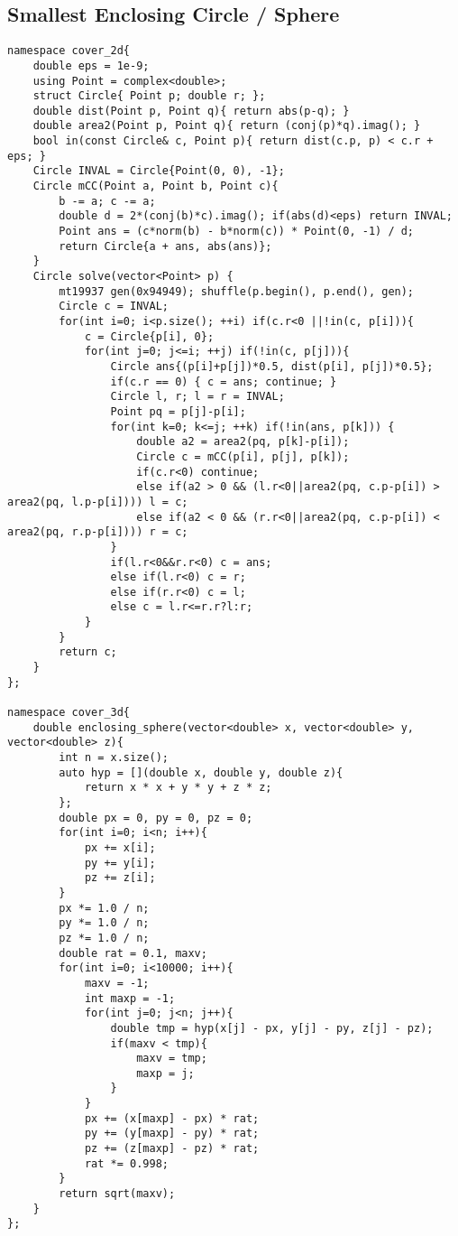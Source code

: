 \documentclass[landscape, 8pt, a4paper, oneside, twocolumn]{extarticle}
\begin{document}
\subsection{Smallest Enclosing Circle / Sphere}
\begin{verbatim}
namespace cover_2d{
	double eps = 1e-9;
	using Point = complex<double>;
	struct Circle{ Point p; double r; };
	double dist(Point p, Point q){ return abs(p-q); }
	double area2(Point p, Point q){ return (conj(p)*q).imag(); }
	bool in(const Circle& c, Point p){ return dist(c.p, p) < c.r + eps; }
	Circle INVAL = Circle{Point(0, 0), -1};
	Circle mCC(Point a, Point b, Point c){
		b -= a; c -= a;
		double d = 2*(conj(b)*c).imag(); if(abs(d)<eps) return INVAL;
		Point ans = (c*norm(b) - b*norm(c)) * Point(0, -1) / d;
		return Circle{a + ans, abs(ans)};
	}
	Circle solve(vector<Point> p) {
		mt19937 gen(0x94949); shuffle(p.begin(), p.end(), gen);
		Circle c = INVAL;
		for(int i=0; i<p.size(); ++i) if(c.r<0 ||!in(c, p[i])){
			c = Circle{p[i], 0};
			for(int j=0; j<=i; ++j) if(!in(c, p[j])){
				Circle ans{(p[i]+p[j])*0.5, dist(p[i], p[j])*0.5};
				if(c.r == 0) { c = ans; continue; }
				Circle l, r; l = r = INVAL;
				Point pq = p[j]-p[i];
				for(int k=0; k<=j; ++k) if(!in(ans, p[k])) {
					double a2 = area2(pq, p[k]-p[i]);
					Circle c = mCC(p[i], p[j], p[k]);
					if(c.r<0) continue;
					else if(a2 > 0 && (l.r<0||area2(pq, c.p-p[i]) > area2(pq, l.p-p[i]))) l = c;
					else if(a2 < 0 && (r.r<0||area2(pq, c.p-p[i]) < area2(pq, r.p-p[i]))) r = c;
				}
				if(l.r<0&&r.r<0) c = ans;
				else if(l.r<0) c = r;
				else if(r.r<0) c = l;
				else c = l.r<=r.r?l:r;
			}
		}
		return c;
	}
};

namespace cover_3d{
	double enclosing_sphere(vector<double> x, vector<double> y, vector<double> z){
		int n = x.size();
		auto hyp = [](double x, double y, double z){
			return x * x + y * y + z * z;
		};
		double px = 0, py = 0, pz = 0;
		for(int i=0; i<n; i++){
			px += x[i];
			py += y[i];
			pz += z[i];
		}
		px *= 1.0 / n;
		py *= 1.0 / n;
		pz *= 1.0 / n;
		double rat = 0.1, maxv;
		for(int i=0; i<10000; i++){
			maxv = -1;
			int maxp = -1;
			for(int j=0; j<n; j++){
				double tmp = hyp(x[j] - px, y[j] - py, z[j] - pz);
				if(maxv < tmp){
					maxv = tmp;
					maxp = j;
				}
			}
			px += (x[maxp] - px) * rat;
			py += (y[maxp] - py) * rat;
			pz += (z[maxp] - pz) * rat;
			rat *= 0.998;
		}
		return sqrt(maxv);
	}
};
\end{verbatim}
\end{document}
